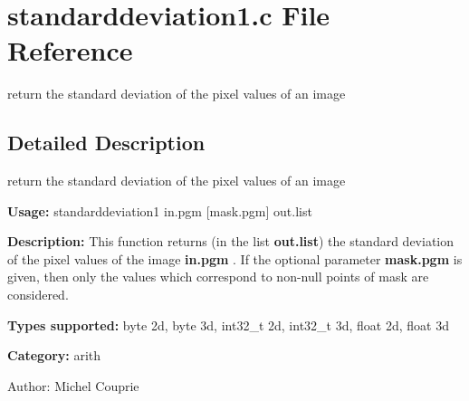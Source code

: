 \section{standarddeviation1.c File Reference}
\label{standarddeviation1_8c}
return the standard deviation of the pixel values of an image 



\subsection{Detailed Description}
return the standard deviation of the pixel values of an image 

{\bf Usage:} standarddeviation1 in.pgm [mask.pgm] out.list

{\bf Description:} This function returns (in the list {\bf out.list}) the standard deviation of the pixel values of the image {\bf in.pgm} . If the optional parameter {\bf mask.pgm} is given, then only the values which correspond to non-null points of mask are considered.

{\bf Types supported:} byte 2d, byte 3d, int32\_\-t 2d, int32\_\-t 3d, float 2d, float 3d

{\bf Category:} arith

\begin{Desc}
\item[Author:]Michel Couprie \end{Desc}
